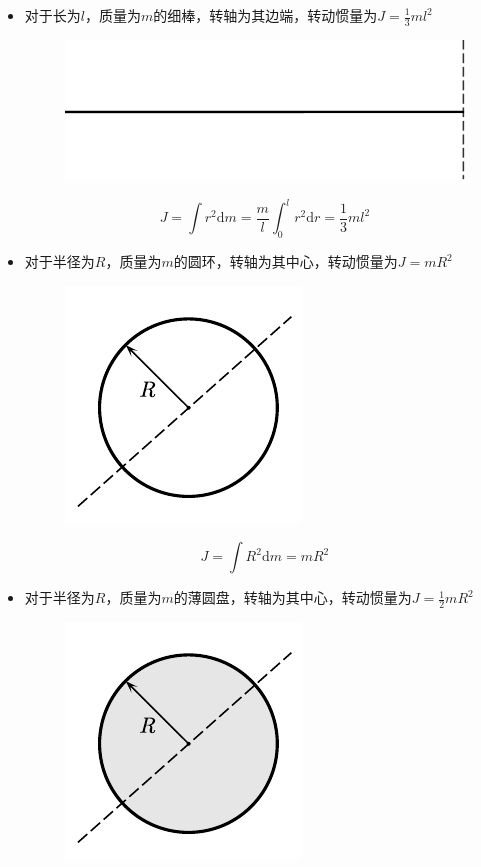 \documentclass[12pt, a4paper, twoside]{ctexbook}
\begin{document}
\begin{itemize}
\begin{itemize}
        \item 对于长为$l$，质量为$m$的细棒，转轴为其边端，转动惯量为$J=\frac{1}{3}ml^2$
        \begin{figure}[H]
            \centerline{\includegraphics[scale=0.6]{CH03FIG02.pdf}}
        \end{figure}
        $$
        J=\int r^2 \mathrm{d}m=\frac{m}{l}\int_{0}^{l} r^2 \mathrm{d}r=\frac{1}{3}ml^2
        $$
        \item 对于半径为$R$，质量为$m$的圆环，转轴为其中心，转动惯量为$J=mR^2$
        \begin{figure}[H]
            \centerline{\includegraphics[scale=1.0]{CH03FIG03.pdf}}
        \end{figure}
        $$
        J=\int R^2 \mathrm{d}m=mR^2
        $$
        \item 对于半径为$R$，质量为$m$的薄圆盘，转轴为其中心，转动惯量为$J=\frac{1}{2}mR^2$
        \begin{figure}[H]
            \centerline{\includegraphics[scale=1.0]{CH03FIG04.pdf}}

\end{figure}
\end{itemize}
\end{itemize}
\end{document}
